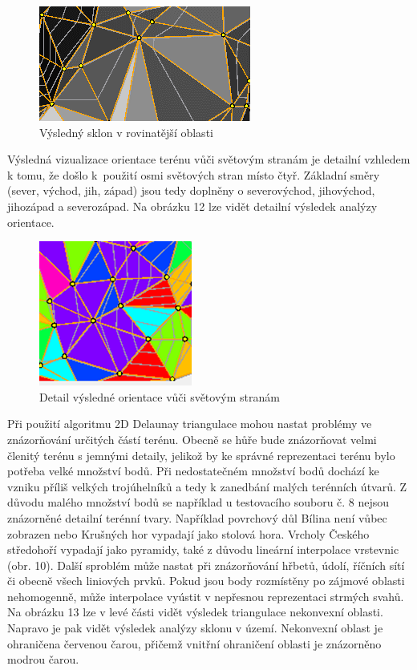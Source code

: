 \documentclass{article}
\begin{document}
\begin{spacing}{1.5}
\begin{figure}[htbp]
    \centering
    \includegraphics[width=0.3\linewidth]{images/11sklon.png}
    \caption{Výsledný sklon v rovinatější oblasti}
    \label{fig:enter-label}
\end{figure}

\newpage
Výsledná vizualizace orientace terénu vůči světovým stranám je detailní vzhledem k tomu, že došlo k~použití osmi světových stran místo čtyř.  Základní směry (sever, východ, jih, západ) jsou tedy doplněny o severovýchod, jihovýchod, jihozápad a severozápad. Na obrázku 12 lze vidět detailní výsledek analýzy orientace. 

\begin{figure}[htbp]
    \centering
    \includegraphics[width=0.3\linewidth]{images/12orientace.png}
    \caption{Detail výsledné orientace vůči světovým stranám}
    \label{fig:enter-label}
\end{figure}

Při použití algoritmu 2D Delaunay triangulace mohou nastat problémy ve znázorňování určitých částí terénu. Obecně se hůře bude znázorňovat velmi členitý terénu s jemnými detaily, jelikož by ke správné reprezentaci terénu bylo potřeba velké množství bodů. Při nedostatečném množství bodů dochází ke vzniku příliš velkých trojúhelníků a tedy k zanedbání malých terénních útvarů. Z důvodu malého množství bodů se například u testovacího souboru č. 8 nejsou znázorněné detailní terénní tvary. Například povrchový důl Bílina není vůbec zobrazen nebo Krušných hor vypadají jako stolová hora. Vrcholy Českého středohoří vypadají jako pyramidy, také z důvodu lineární interpolace vrstevnic (obr. 10). Další sproblém může nastat při znázorňování hřbetů, údolí, říčních sítí či obecně všech liniových prvků. Pokud jsou body rozmístěny po zájmové oblasti nehomogenně, může interpolace vyústit v nepřesnou reprezentaci strmých svahů.\\
Na obrázku 13 lze v levé části vidět výsledek triangulace nekonvexní oblasti. Napravo je pak vidět výsledek analýzy sklonu v území. Nekonvexní oblast je ohraničena červenou čarou, přičemž vnitřní ohraničení oblasti je znázorněno modrou čarou.   


\end{spacing}
\end{document}
